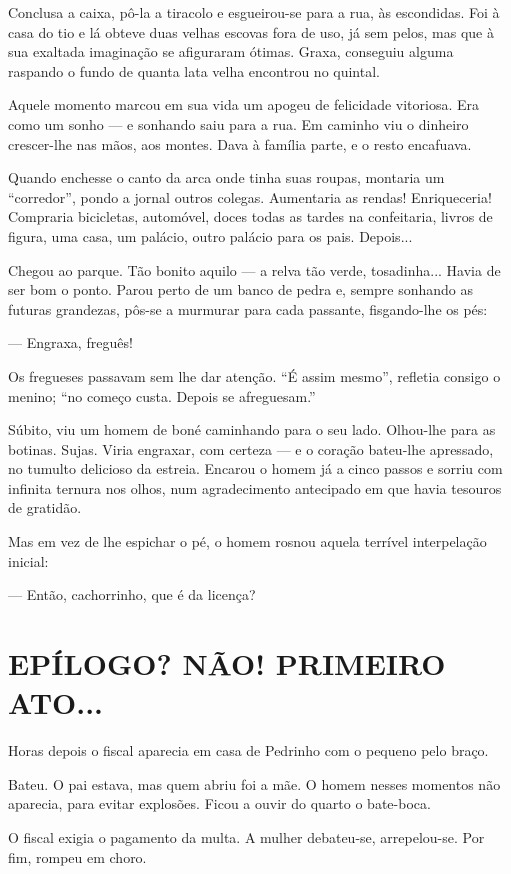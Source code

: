 Conclusa a caixa, pô-la a tiracolo e esgueirou-se para a rua, às
escondidas. Foi à casa do tio e lá obteve duas velhas escovas fora de
uso, já sem pelos, mas que à sua exaltada imaginação se afiguraram
ótimas. Graxa, conseguiu alguma raspando o fundo de quanta lata velha
encontrou no quintal.

Aquele momento marcou em sua vida um apogeu de felicidade vitoriosa. Era
como um sonho --- e sonhando saiu para a rua. Em caminho viu o dinheiro
crescer-lhe nas mãos, aos montes. Dava à família parte, e o resto
encafuava.

Quando enchesse o canto da arca onde tinha suas roupas, montaria um
``corredor'', pondo a jornal outros colegas. Aumentaria as rendas!
Enriqueceria! Compraria bicicletas, automóvel, doces todas as tardes na
confeitaria, livros de figura, uma casa, um palácio, outro palácio para
os pais. Depois...

Chegou ao parque. Tão bonito aquilo --- a relva tão verde, tosadinha...
Havia de ser bom o ponto. Parou perto de um banco de pedra e, sempre
sonhando as futuras grandezas, pôs-se a murmurar para cada passante,
fisgando-lhe os pés:

--- Engraxa, freguês!

Os fregueses passavam sem lhe dar atenção. ``É assim mesmo'', refletia
consigo o menino; ``no começo custa. Depois se afreguesam.''

Súbito, viu um homem de boné caminhando para o seu lado. Olhou-lhe para
as botinas. Sujas. Viria engraxar, com certeza --- e o coração bateu-lhe
apressado, no tumulto delicioso da estreia. Encarou o homem já a cinco
passos e sorriu com infinita ternura nos olhos, num agradecimento
antecipado em que havia tesouros de gratidão.

Mas em vez de lhe espichar o pé, o homem rosnou aquela terrível
interpelação inicial:

--- Então, cachorrinho, que é da licença?

\section{EPÍLOGO? NÃO! PRIMEIRO ATO...}

Horas depois o fiscal aparecia em casa de Pedrinho com o pequeno pelo
braço.

Bateu. O pai estava, mas quem abriu foi a mãe. O homem nesses momentos
não aparecia, para evitar explosões. Ficou a ouvir do quarto o
bate-boca.

O fiscal exigia o pagamento da multa. A mulher debateu-se, arrepelou-se.
Por fim, rompeu em choro.

